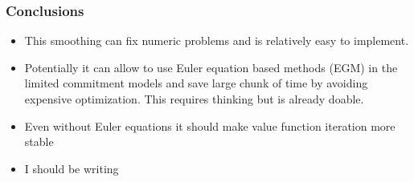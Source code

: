 \documentclass[aspectratio=169]{beamer}
\let\olditem\item
\renewcommand{\item}{%
\olditem\vspace{\fill}}
\begin{document}
\begin{frame}
\frametitle{Conclusions}
\begin{itemize}
\item This smoothing can fix numeric problems and is relatively easy to implement.
\item Potentially it can allow to use Euler equation based methods (EGM) in the limited commitment models and save large chunk of time by avoiding expensive optimization. This requires thinking but is already doable.
\item Even without Euler equations it should make value function iteration more stable
\item I should be writing
\end{itemize}
\end{frame}
\end{document}
